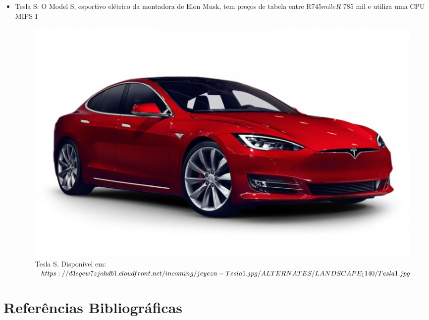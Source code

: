 \documentclass[12pt,a4paper]{article}
\begin{document}
\begin{itemize}
	\item Tesla S: O Model S, esportivo elétrico da montadora de Elon Musk, tem preços de tabela entre R$ 745 mil e R$ 785 mil e utiliza uma CPU MIPS I
	\begin{figure}[H]
		\includegraphics[scale=0.3]{xna8fZ.png}
		\centering
		\caption{Tesla S. Disponível em: $https://\newline d3egew7zjohdb1.cloudfront.net/incoming/jeyezn-Tesla1.jpg/ \newline ALTERNATES/LANDSCAPE_1140/Tesla1.jpg$}
	\end{figure}
	

\end{itemize}
\section*{Referências Bibliográficas}


\end{document}
